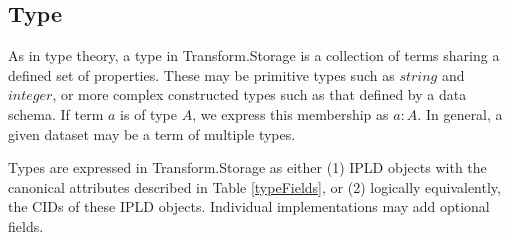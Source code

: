 \documentclass[9pt, oneside]{article}   	%
\begin{document}
\begin{multicols}{2}
\subsection{Type}\label{type}

As in type theory, a type in Transform.Storage is a collection of terms sharing a defined set of properties. These may be primitive types such as $string$ and $integer$, or more complex constructed types such as that defined by a data schema. If term $a$ is of type $A$, we express this membership as $a:A$. In general, a given dataset may be a term of multiple types.

Types are expressed in Transform.Storage as either (1) IPLD objects with the canonical attributes described in Table \ref{typeFields}, or (2) logically equivalently, the CIDs of these IPLD objects. Individual implementations may add optional fields.


\end{multicols}
\end{document}
